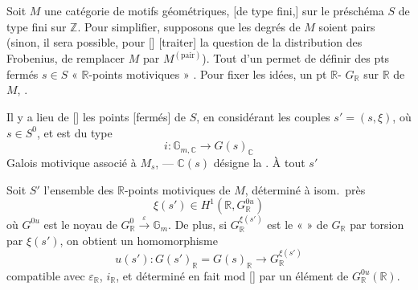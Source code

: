 
Soit $M$ une catégorie de motifs géométriques, [de type fini,] sur le
préschéma $S$ de type fini sur $\mathbb{Z}$. Pour simplifier, supposons que
les degrés de $M$ soient pairs (sinon, il sera possible, pour
[] \struck{\ill{}} [traiter] la question de la
distribution des Frobenius, de remplacer $M$ par $M^{(\mathrm{pair})}$).
Tout  d'un \ill{} permet de définir des pts fermés
$s \in S$ \ill{} « $\mathbb{R}$-points motiviques » 
\ill{} \ill{}. Pour fixer les idées, \ill{} \ill{} un pt
$\mathbb{R}$- \ill{} \ill{} 
$G_{\mathbb{R}}$ sur $\mathbb{R}$ de $M$, \ill{} \ill{} \ill{}.

Il y a lieu de \struck{\ill{}} [] les points
[fermés] de $S$, en considérant les couples $s' = (s, \xi)$, où
$s \in S^{0}$, et \ill{} \struck{\ill{}}  \ill{}
est du type
\[
  i : \mathbb{G}_{m,\mathbb{C}} \to G(s)_{\mathbb{C}}
\]
\ill{} Galois motivique associé à $M_s$, --- $\mathbb{C}(s)$ désigne la
\ill{} \ill{} \ill{} . À tout $s'$ \ill{}


 Soit $S'$ l'ensemble des $\mathbb{R}$-points motiviques de
$M$,  \ill{} \ill{} déterminé à isom.\ près \struck{\ill{}}
\[
  \xi(s') \in H^{1}(\mathbb{R}, G^{0u}_{\mathbb{R}})
\]
où $G^{0u}$ est le noyau de $G^{0}_{\mathbb{R}}
\xrightarrow{\ \varepsilon\ } \mathbb{G}_m$. De plus, si
$G_{\mathbb{R}}^{\xi(s')}$ est le «  » \ill{} de
$G_{\mathbb{R}}$ par torsion par $\xi(s')$, on obtient \ill{} un
homomorphisme \ill{}
\[
  u(s') : G(s')_{\mathbb{R}} = G(s)_{\mathbb{R}} \longrightarrow
  G_{\mathbb{R}}^{\xi(s')}
\]
compatible avec $\varepsilon_{\mathbb{R}}$, $i_{\mathbb{R}}$, et déterminé
en fait mod  [\ill{}] par un élément de
$G^{0u}_{\mathbb{R}}(\mathbb{R})$.

